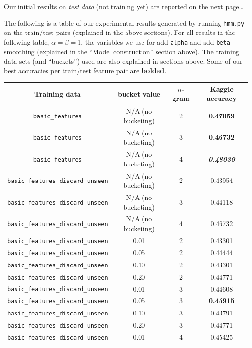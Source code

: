 \documentclass{article}
\begin{document}
\par\bigskip
Our initial results on \emph{test data} (not training yet) are reported on the next page\ldots

\newpage
The following is a table of our experimental results generated by running \texttt{hmm.py} on the train/test pairs (explained in the above sections). For all results in the following table, $\alpha = \beta = 1$, the variables we use for add-\texttt{alpha} and add-\texttt{beta} smoothing (explained in the ``Model construction'' section above). The training data sets (and ``buckets'') used are also explained in sections above. Some of our best accuracies per train/test feature pair are \textbf{bolded}.\par\bigskip

{\small
\begin{tabular}{|c|c|c|c|}\hline
Training data & bucket value & $n$-gram & Kaggle accuracy\\\hline
\texttt{basic\_features} & N/A (no bucketing) & 2 & \textbf{0.47059}\\\hline
\texttt{basic\_features} & N/A (no bucketing) & 3 & \textbf{0.46732}\\\hline
\texttt{basic\_features} & N/A (no bucketing) & 4 & \textbf{\textit{0.48039}}\\\hline\hline
\texttt{basic\_features\_discard\_unseen} & N/A (no bucketing) & 2 & 0.43954\\\hline
\texttt{basic\_features\_discard\_unseen} & N/A (no bucketing) & 3 & 0.44118\\\hline
\texttt{basic\_features\_discard\_unseen} & N/A (no bucketing) & 4 & 0.46732\\\hline
\texttt{basic\_features\_discard\_unseen} & 0.01 & 2 & 0.43301\\
\texttt{basic\_features\_discard\_unseen} & 0.05 & 2 & 0.44444\\
\texttt{basic\_features\_discard\_unseen} & 0.10 & 2 & 0.43301\\
\texttt{basic\_features\_discard\_unseen} & 0.20 & 2 & 0.44771\\\hline
\texttt{basic\_features\_discard\_unseen} & 0.01 & 3 & 0.44608\\
\texttt{basic\_features\_discard\_unseen} & 0.05 & 3 & \textbf{0.45915}\\
\texttt{basic\_features\_discard\_unseen} & 0.10 & 3 & 0.43791\\
\texttt{basic\_features\_discard\_unseen} & 0.20 & 3 & 0.44771\\\hline
\texttt{basic\_features\_discard\_unseen} & 0.01 & 4 & 0.45425\\

\end{tabular}}
\end{document}

